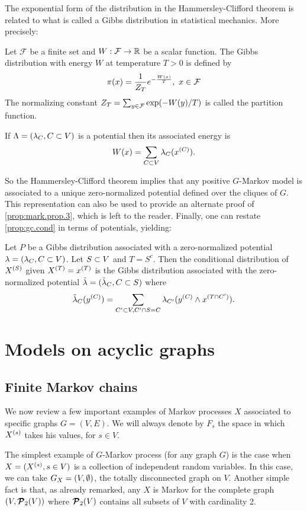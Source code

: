 The exponential form of the distribution in the Hammersley-Clifford
theorem is related to what is called a Gibbs distribution in statistical
mechanics. More precisely:
\begin{definition}
\label{def:gibbs}
Let $\mathcal F$ be a finite set and $W:\mathcal F \to {\mathbb{R}}$ be a scalar
function. The Gibbs distribution with energy $W$ at temperature $T>0$
is defined by
$$\pi(x) = \frac{1}{Z_T}e^{-\frac{W(x)}{T}}, \ x\in {\mathcal F}$$
The normalizing constant $Z_T = \sum_{y\in{\mathcal F}} \exp(-W(y)/T)$ is
called the partition function.

If $\Lambda = (\lambda_C, C\subset V)$ is a potential then its associated energy is
$$
W(x) = \sum_{C\subset V} \lambda_C(x^{(C)}).
$$
\end{definition}
So the Hammersley-Clifford theorem implies that any positive
$G$-Markov model is associated to a unique zero-normalized
potential defined over the cliques of $G$. This representation can also be used to
provide an alternate proof of  \cref{prop:mark.prop.3},
which is left to the reader. Finally, one can restate 
\cref{prop:gc.cond} in terms of potentials, yielding:
\begin{proposition}
Let $P$ be a Gibbs distribution associated with a zero-normalized potential $\lambda = (\lambda_C,
C\subset V)$. Let $S\subset V$ and $T = S^c$. Then the conditional
distribution of $X^{(S)}$ given $X^{(T)} = x^{(T)}$ is the Gibbs distribution
associated with the zero-normalized potential $\tilde {\lambda} = (\tilde {\lambda}_C,
C\subset S)$ where 
$$
\tilde {\lambda}_C(y^{(C)}) = \sum_{C'\subset V, C'\cap S = C} \lambda_{C'}(y^{(C)}\wedge
x^{(T\cap C')}).
$$
\end{proposition}


\section{Models on acyclic graphs}

\subsection{Finite Markov chains}
We now review a few important examples of Markov processes $X$
associated to specific graphs $G=(V,E)$. We will always denote by
$F_s$ the space in which $X^{(s)}$ takes his values, for $s\in V$.

The simplest example of $G$-Markov process (for any graph $G$) is the
case when $X= (X^{(s)}, s\in V)$ is a collection of independent random
variables. In this case, we can take $G_X=(V, \emptyset)$, the totally
disconnected graph on $V$. Another simple fact is that, as already
remarked, any $X$ is Markov for the
complete graph $(V, \bm{{\mathcal P}}_2(V))$ where $\bm{{\mathcal P}}_2(V)$ contains
all subsets of $V$ with cardinality 2.

